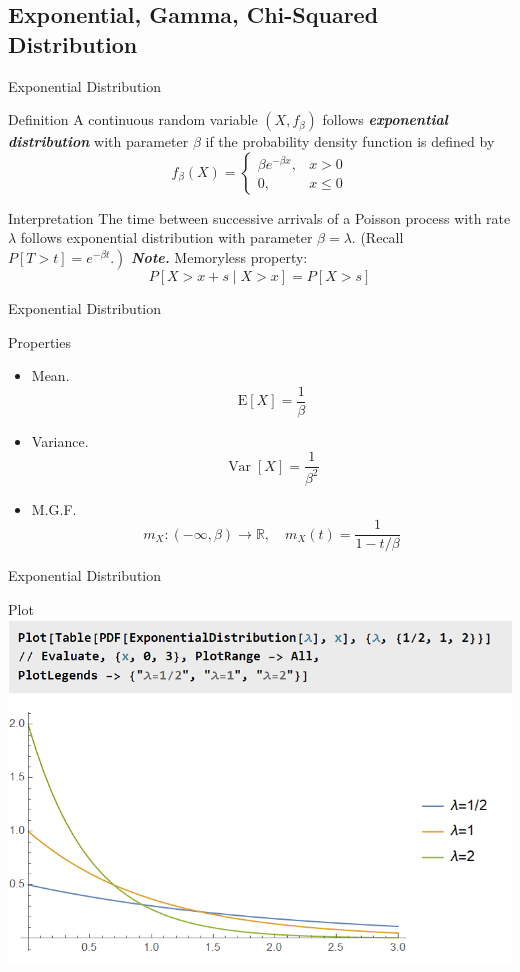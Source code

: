 \documentclass{beamer}
\newcommand{\bb}[1]{\textcolor{antiquefuchsia}{\textbf{\textit{#1}}}}
\begin{document}
\subsection{Exponential, Gamma, Chi-Squared Distribution}
\begin{frame}{Exponential Distribution}
\begin{block}{Definition}
A continuous random variable $\left(X, f_{\beta}\right)$ follows \bb{exponential distribution} with parameter $\beta$ if the probability density function is defined by
$$
f_{\beta}(X)= \begin{cases}\beta e^{-\beta x}, & x>0 \\ 0, & x \leq 0\end{cases}
$$
\end{block}
\begin{block}{Interpretation}
The time between successive arrivals of a Poisson process with rate $\lambda$ follows exponential distribution with parameter $\beta=\lambda$. (Recall $\left.P[T>t]=e^{-\beta t} .\right)$
\bb{Note.} Memoryless property:
$$
P[X>x+s \mid X>x]=P[X>s]
$$
\end{block}
\end{frame}

\begin{frame}{Exponential Distribution}
\begin{block}{Properties}
\begin{itemize}
\item Mean.
$$
\mathrm{E}[X]=\frac{1}{\beta}
$$
\item Variance. 
$$
\operatorname{Var}[X]=\frac{1}{\beta^{2}}
$$
\item M.G.F.
$$
m_{X}:(-\infty, \beta) \rightarrow \mathbb{R}, \quad m_{X}(t)=\frac{1}{1-t / \beta}
$$
\end{itemize}
\end{block}
\end{frame}

\begin{frame}{Exponential Distribution}
\begin{block}{Plot}
\includegraphics[scale=0.5]{plot.png}
\end{block}
\end{frame}
\end{document}
